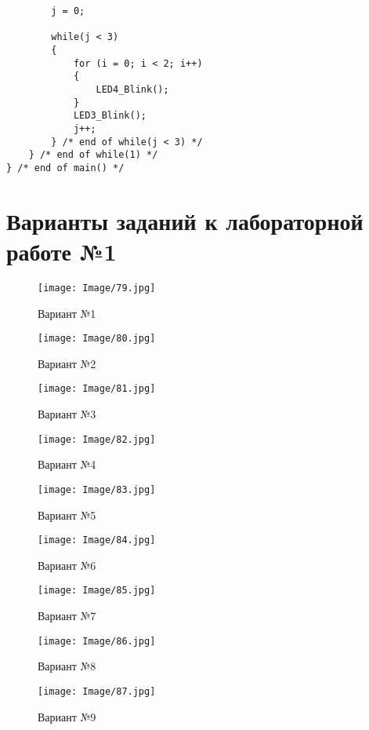 \begin{verbatim}
        j = 0;

        while(j < 3)
        {
            for (i = 0; i < 2; i++)
            {            
                LED4_Blink();
            }
            LED3_Blink();
            j++;
        } /* end of while(j < 3) */
    } /* end of while(1) */
} /* end of main() */
\end{verbatim}

\section{Варианты заданий к лабораторной работе №1}
\label{Lab1Var}
\begin{figure}[H]
\begin{center}
\texttt{[image: Image/79.jpg]} 
\end{center}
\caption{Вариант №1}
\end{figure}
\begin{figure}[H]
\begin{center}
\texttt{[image: Image/80.jpg]} 
\end{center}
\caption{Вариант №2}
\end{figure}
\begin{figure}[H]
\begin{center}
\texttt{[image: Image/81.jpg]} 
\end{center}
\caption{Вариант №3}
\end{figure}
\begin{figure}[H]
\begin{center}
\texttt{[image: Image/82.jpg]} 
\end{center}
\caption{Вариант №4}
\end{figure}
\begin{figure}[H]
\begin{center}
\texttt{[image: Image/83.jpg]} 
\end{center}
\caption{Вариант №5}
\end{figure}
\begin{figure}[H]
\begin{center}
\texttt{[image: Image/84.jpg]} 
\end{center}
\caption{Вариант №6}
\end{figure}
\begin{figure}[H]
\begin{center}
\texttt{[image: Image/85.jpg]} 
\end{center}
\caption{Вариант №7}
\end{figure}
\begin{figure}[H]
\begin{center}
\texttt{[image: Image/86.jpg]} 
\end{center}
\caption{Вариант №8}
\end{figure}
\begin{figure}[H]
\begin{center}
\texttt{[image: Image/87.jpg]} 
\end{center}
\caption{Вариант №9}
\end{figure}